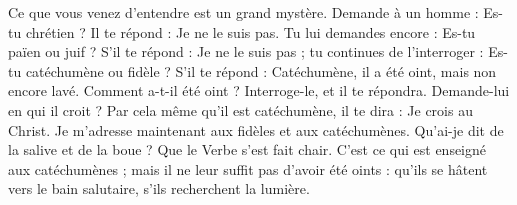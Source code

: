 Ce que vous venez d’entendre est un grand mystère. Demande à un homme : Es-tu chrétien ? Il te répond : Je ne le suis pas. Tu lui demandes encore : Es-tu païen ou juif ? S’il te répond : Je ne le suis pas ; tu continues de l’interroger : Es-tu catéchumène ou fidèle ? S’il te répond : Catéchumène, il a été oint, mais non encore lavé. Comment a-t-il été oint ? Interroge-le, et il te répondra. Demande-lui en qui il croit ? Par cela même qu’il est catéchumène, il te dira : Je crois au Christ. Je m’adresse maintenant aux fidèles et aux catéchumènes. Qu’ai-je dit de la salive et de la boue ? Que le Verbe s’est fait chair. C’est ce qui est enseigné aux catéchumènes ; mais il ne leur suffit pas d’avoir été oints : qu’ils se hâtent vers le bain salutaire, s’ils recherchent la lumière.
